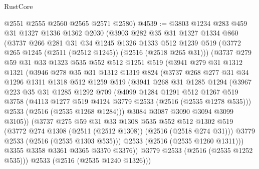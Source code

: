 \begin{lexlean}{RustCore}
\begin{coremodule}
      @2551
      @2555
      @2560
      @2565
      @2571
      @2580)
@4539 := @3803
    @1234
    @283
    @459
    @31
    @1327
    @1336
    @1362
    @2030
    (@3903
      @282
      @35
      @31
      @1327
      @1334
      @860
      (@3737
        @266
        @281
        @31
        @34
        @1245
        @1326
        @1333
        @512
        @1239
        @519
        (@3772 @265 @1245 (@2511 (@2512 @1245)) (@2516 (@2518 @265 @31)))
        (@3737
          @279
          @59
          @31
          @33
          @1323
          @535
          @552
          @512
          @1251
          @519
          (@3941
            @279
            @31
            @1312
            @1321
            (@3946
              @278
              @35
              @31
              @1312
              @1319
              @824
              (@3737
                @268
                @277
                @31
                @34
                @1296
                @1311
                @1318
                @512
                @1259
                @519
                (@3941
                  @268
                  @31
                  @1285
                  @1294
                  (@3967
                    @223
                    @35
                    @31
                    @1285
                    @1292
                    @709
                    (@4099
                      @1284
                      @1291
                      @512
                      @1267
                      @519
                      @3758
                      (@4113 @1277 @519 @4124 @3779 @2533 (@2516 (@2535 @1278 @535)))
                      @2533
                      (@2516 (@2535 @1268 @1284)))
                    @3084
                    @3087
                    @3090
                    @3094
                    @3099
                    @3105))
                (@3737
                  @275
                  @59
                  @31
                  @33
                  @1308
                  @535
                  @552
                  @512
                  @1302
                  @519
                  (@3772 @274 @1308 (@2511 (@2512 @1308)) (@2516 (@2518 @274 @31)))
                  @3779
                  @2533
                  (@2516 (@2535 @1303 @535)))
                @2533
                (@2516 (@2535 @1260 @1311)))
              @3355
              @3358
              @3361
              @3365
              @3370
              @3376))
          @3779
          @2533
          (@2516 (@2535 @1252 @535)))
        @2533
        (@2516 (@2535 @1240 @1326)))

\end{coremodule}
\end{lexlean}
